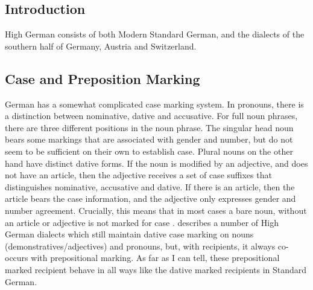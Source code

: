 \subsection{Introduction}
High German consists of both Modern Standard German, and the dialects of the southern half of Germany, Austria and Switzerland.
\subsection{Case and Preposition Marking}
German has a somewhat complicated case marking system. In pronouns, there is a distinction between nominative, dative and accusative. For full noun phrases, there are three different positions in the noun phrase. The singular head noun bears some markings that are associated with gender and number, but do not seem to be sufficient on their own to establish case. Plural nouns on the other hand have distinct dative forms. If the noun is modified by an adjective, and does not have an article, then the adjective receives a set of case suffixes that distinguishes nominative, accusative and dative. If there is an article, then the article bears the case information, and the adjective only expresses gender and number agreement. Crucially, this means that in most cases a bare noun, without an article or adjective is not marked for case \citep{Draye.1996}.
\cite{Seiler.2003} describes a number of High German dialects which still maintain dative case marking on nouns (demonstratives/adjectives) and pronouns, but, with recipients, it always co-occurs with prepositional marking. As far as I can tell, these prepositional marked recipient behave in all ways like the dative marked recipients in Standard German.
